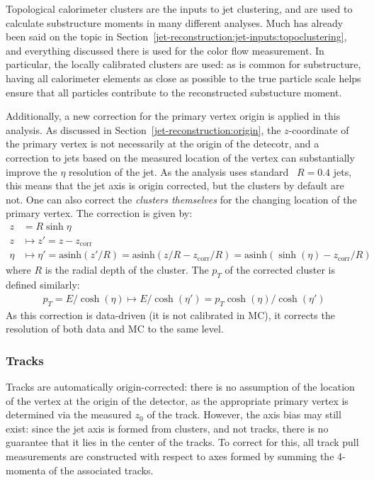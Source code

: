Topological calorimeter clusters are the inputs to jet clustering, and are used to calculate substructure moments in many different analyses. Much has already been said on the topic in Section~\ref{jet-reconstruction:jet-inputs:topoclustering}, and everything discussed there is used for the color flow measurement. In particular, the locally calibrated clusters are used: as is common for substructure, having all calorimeter elements as close as possible to the true particle scale helps ensure that all particles contribute to the reconstructed substucture moment. 

Additionally, a new correction for the primary vertex origin is applied in this analysis. As discussed in Section~\ref{jet-reconstruction:origin}, the $z$-coordinate of the primary vertex is not necessarily at the origin of the detecotr, and a correction to jets based on the measured location of the vertex can substantially improve the $\eta$ resolution of the jet. As the analysis uses standard \akt~$R=0.4$ jets, this means that the jet axis is origin corrected, but the clusters by default are not. One can also correct the \textit{clusters themselves} for the changing location of the primary vertex. The correction is given by: 
%
\begin{align}
z &= R\sinh\eta\nonumber\\
z &\mapsto z' = z - z_\text{corr}\nonumber\\
\eta &\mapsto \eta' = \text{asinh} (z'/R) = \text{asinh}(z/R - z_\text{corr}/R) = \text{asinh}(\sinh(\eta) - z_\text{corr}/R)
\end{align}
%
where $R$ is the radial depth of the cluster. The $p_T$ of the corrected cluster is defined similarly:
%
\begin{align}
p_T=E/\cosh(\eta)\mapsto E/\cosh(\eta')=p_T\cosh(\eta)/\cosh(\eta')
\end{align}
%
As this correction is data-driven (it is not calibrated in MC), it corrects the resolution of both data and MC to the same level.

\subsubsection{Tracks}

Tracks are automatically origin-corrected: there is no assumption of the location of the vertex at the origin of the detector, as the appropriate primary vertex is determined via the measured $z_0$ of the track. However, the axis bias may still exist: since the jet axis is formed from clusters, and not tracks, there is no guarantee that it lies in the center of the tracks. To correct for this, all track pull measurements are constructed with respect to axes formed by summing the 4-momenta of the associated tracks.

